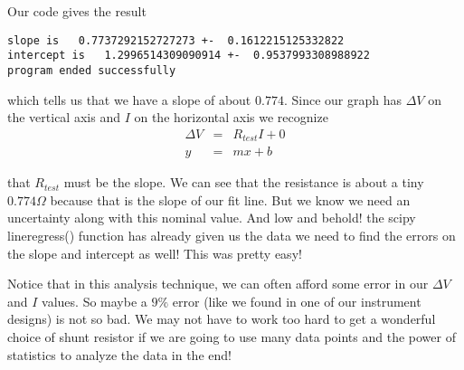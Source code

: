 Our code gives the result

\begin {verbatim}
slope is   0.7737292152727273 +-  0.1612215125332822
intercept is   1.2996514309090914 +-  0.9537993308988922
program ended successfully
\end{verbatim}

which tells us that we have a slope of about $0.774.$ Since our graph
has $\Delta V$ on the vertical axis and $I$ on the horizontal axis we
recognize 
\begin{eqnarray*}
	\Delta V &=&R_{test}I+0 \\
           y &=&mx+b
\end{eqnarray*}

that $R_{test}$ must be the slope. We can see that the resistance is about a tiny $0.774\unit{\Omega}$ because that is the slope of our fit line. But we know we need an uncertainty along with this nominal value. And low and behold! the scipy lineregress() function has already given us the data we need to find the errors on the slope and intercept as well! This was pretty easy!

Notice that in this analysis technique, we can often afford some error in our 
$\Delta V$ and $I$ values. So maybe a $9\%$ error (like we found in one of
our instrument designs) is not so bad. We may not have to work too hard to
get a wonderful choice of shunt resistor if we are going to use many data
points and the power of statistics to analyze the data in the end!

